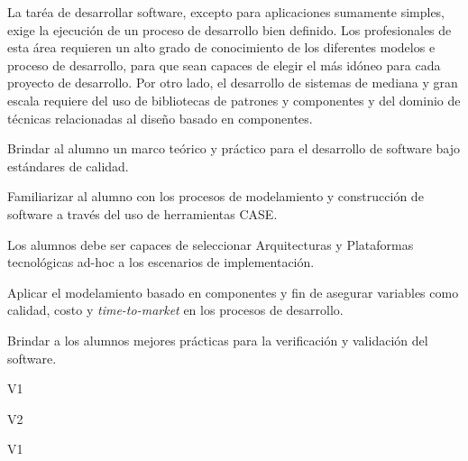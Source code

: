 \begin{syllabus}


\begin{justification}
La taréa de desarrollar software, excepto para aplicaciones sumamente simples, exige la ejecución de un proceso de desarrollo bien definido. 
Los profesionales de esta área requieren un alto grado de conocimiento de los diferentes modelos e proceso de desarrollo, 
para que sean capaces de elegir el más idóneo para cada proyecto de desarrollo. Por otro lado, el desarrollo de sistemas 
de mediana y gran escala requiere del uso de bibliotecas de patrones y componentes y del dominio de técnicas relacionadas al 
diseño basado en componentes.
\end{justification}

\begin{goals}
\item Brindar al alumno un marco teórico y práctico para el desarrollo de software bajo estándares de calidad.
\item Familiarizar al alumno con los procesos de modelamiento y construcción de software a través del uso de herramientas CASE.
\item Los alumnos debe ser capaces de seleccionar Arquitecturas y Plataformas tecnológicas ad-hoc a los escenarios de implementación.
\item Aplicar el modelamiento basado en componentes y fin de asegurar variables como calidad, costo  y {\it time-to-market} en los procesos de desarrollo.
\item Brindar a los alumnos mejores prácticas para la verificación y validación del software.
\end{goals}

\begin{outcomes}{V1}
    \item {}
    \item {}
\end{outcomes}

\begin{outcomes}{V2}
    \item {}
\end{outcomes}

\begin{competences}{V1}
      \item {} 
      \item {}
      \item {}
      \item {}
      \item {}
      \item {}
\end{competences}


\end{syllabus}
